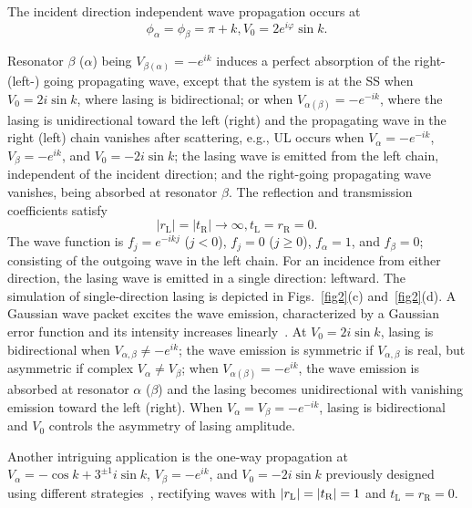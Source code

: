 \documentclass[prl,showpacs,superscriptaddress,twocolumn]{revtex4-1}
\begin{document}
The incident direction independent wave propagation occurs at
\begin{equation}
\phi _{\alpha }=\phi _{\beta }=\pi +k,V_{0}=2e^{i\varphi }\sin k.
\end{equation}

Resonator $\beta $ ($\alpha $) being $V_{\beta (\alpha )}=-e^{ik}$ induces a
perfect absorption of the right- (left-) going propagating wave, except that
the system is at the SS when $V_{0}=2i\sin k$, where lasing is
bidirectional; or when $V_{\alpha (\beta )}=-e^{-ik}$, where the lasing is
unidirectional toward the left (right) and the propagating wave in the right
(left) chain vanishes after scattering, e.g., UL occurs when $V_{\alpha
}=-e^{-ik}$, $V_{\beta }=-e^{ik}$, and $V_{0}=-2i\sin k$; the lasing wave is
emitted from the left chain, independent of the incident direction; and the
right-going propagating wave vanishes, being absorbed at resonator $\beta $.
The reflection and transmission coefficients satisfy
\begin{equation}
\left\vert r_{\mathrm{L}}\right\vert =\left\vert t_{\mathrm{R}}\right\vert
\rightarrow \infty ,t_{\mathrm{L}}=r_{\mathrm{R}}=0.
\end{equation}%
The wave function is $f_{j}=e^{-ikj}$ ($j<0$), $f_{j}=0$ ($j\geqslant 0$), $%
f_{\alpha }=1$, and $f_{\beta }=0$; consisting of the outgoing wave in the
left chain. For an incidence from either direction, the lasing wave is
emitted in a single direction: leftward. The simulation of single-direction
lasing is depicted in Figs.~\ref{fig2}(c) and~\ref{fig2}(d). A Gaussian wave
packet excites the wave emission, characterized by a Gaussian error function
and its intensity increases linearly~\cite{WP}. At $V_{0}=2i\sin k$, lasing
is bidirectional when $V_{\alpha ,\beta }\neq -e^{ik} $; the wave emission
is symmetric if $V_{\alpha ,\beta }$ is real, but asymmetric if complex $%
V_{\alpha }\neq V_{\beta }$; when $V_{\alpha (\beta )}=-e^{ik}$, the wave
emission is absorbed at resonator $\alpha $ ($\beta $) and the lasing
becomes unidirectional with vanishing emission toward the left (right). When
$V_{\alpha }=V_{\beta }=-e^{-ik}$, lasing is bidirectional and $V_{0}$
controls the asymmetry of lasing amplitude.

Another intriguing application is the one-way propagation at $V_{\alpha
}=-\cos k+3^{\pm 1}i\sin k$, $V_{\beta }=-e^{ik}$, and $V_{0}=-2i\sin k$
previously designed using different strategies~\cite{JLNJP,SLonghi15,Lepri},
rectifying waves with $\left\vert r_{\mathrm{L}}\right\vert =\left\vert t_{%
\mathrm{R}}\right\vert =1$ and $t_{\mathrm{L}}=r_{\mathrm{R}}=0$.
\end{document}
